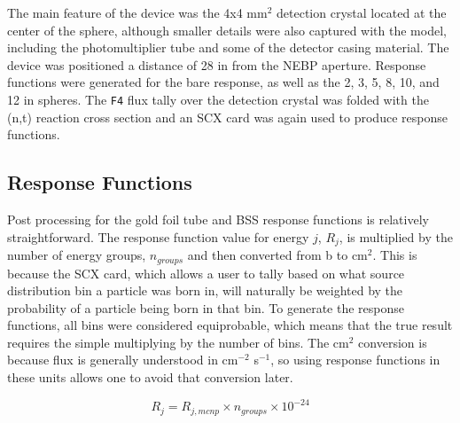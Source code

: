 The main feature of the device was the 4x4 mm$^2$ detection crystal located at the center of the sphere, although smaller details were also captured with the model, including the photomultiplier tube and some of the detector casing material.
The device was positioned a distance of 28 in from the NEBP aperture.
Response functions were generated for the bare response, as well as the 2, 3, 5, 8, 10, and 12 in spheres.
The {\tt F4} flux tally over the detection crystal was folded with the (n,t) reaction cross section and an SCX card was again used to produce response functions.



\subsection{Response Functions}


Post processing for the gold foil tube and BSS response functions is relatively straightforward.
The response function value for energy $j$, $R_j$, is multiplied by the number of energy groups, $n_{groups}$ and then converted from b to cm$^2$.
This is because the SCX card, which allows a user to tally based on what source distribution bin a particle was born in, will naturally be weighted by the probability of a particle being born in that bin.
To generate the response functions, all bins were considered equiprobable, which means that the true result requires the simple multiplying by the number of bins.
The cm$^2$ conversion is because flux is generally understood in cm$^{-2}$ s$^{-1}$, so using response functions in these units allows one to avoid that conversion later.

\begin{equation}
\label{eqn:postprocessing_au}
R_j = R_{j, mcnp} \times n_{groups} \times 10^{-24}
\end{equation}


